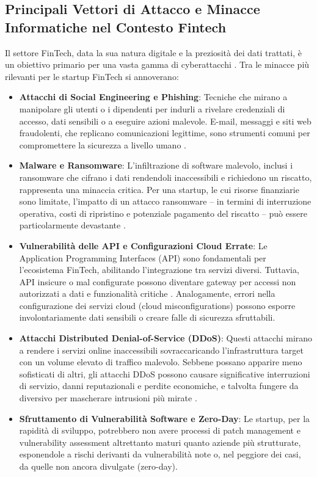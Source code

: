 \subsection{Principali Vettori di Attacco e Minacce Informatiche nel Contesto Fintech}

Il settore FinTech, data la sua natura digitale e la preziosità dei dati trattati, è un obiettivo primario per una vasta gamma di cyberattacchi \cite{cyberThreatsFintech}. Tra le minacce più rilevanti per le startup FinTech si annoverano:

\begin{itemize}
    \item \textbf{Attacchi di Social Engineering e Phishing}: Tecniche che mirano a manipolare gli utenti o i dipendenti per indurli a rivelare credenziali di accesso, dati sensibili o a eseguire azioni malevole. E-mail, messaggi e siti web fraudolenti, che replicano comunicazioni legittime, sono strumenti comuni per compromettere la sicurezza a livello umano \cite{cyberThreatsFintech}.
    
    \item \textbf{Malware e Ransomware}: L'infiltrazione di software malevolo, inclusi i ransomware che cifrano i dati rendendoli inaccessibili e richiedono un riscatto, rappresenta una minaccia critica. Per una startup, le cui risorse finanziarie sono limitate, l'impatto di un attacco ransomware – in termini di interruzione operativa, costi di ripristino e potenziale pagamento del riscatto – può essere particolarmente devastante \cite{cyberThreatsFintech}.
    
    \item \textbf{Vulnerabilità delle API e Configurazioni Cloud Errate}: Le Application Programming Interfaces (API) sono fondamentali per l'ecosistema FinTech, abilitando l'integrazione tra servizi diversi. Tuttavia, API insicure o mal configurate possono diventare gateway per accessi non autorizzati a dati e funzionalità critiche \cite{fintechChallenges}. Analogamente, errori nella configurazione dei servizi cloud (cloud misconfigurations) possono esporre involontariamente dati sensibili o creare falle di sicurezza sfruttabili.
    
    \item \textbf{Attacchi Distributed Denial-of-Service (DDoS)}: Questi attacchi mirano a rendere i servizi online inaccessibili sovraccaricando l'infrastruttura target con un volume elevato di traffico malevolo. Sebbene possano apparire meno sofisticati di altri, gli attacchi DDoS possono causare significative interruzioni di servizio, danni reputazionali e perdite economiche, e talvolta fungere da diversivo per mascherare intrusioni più mirate \cite{fintechChallenges}.
    
    \item \textbf{Sfruttamento di Vulnerabilità Software e Zero-Day}: Le startup, per la rapidità di sviluppo, potrebbero non avere processi di patch management e vulnerability assessment altrettanto maturi quanto aziende più strutturate, esponendole a rischi derivanti da vulnerabilità note o, nel peggiore dei casi, da quelle non ancora divulgate (zero-day).
\end{itemize}


